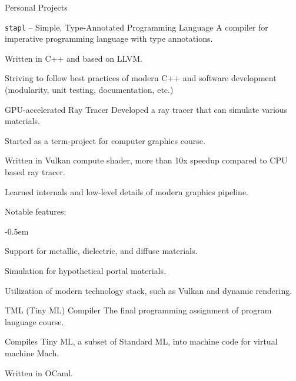 \documentclass{resume}
\begin{document}
\begin{res-section}{Personal Projects}
  \begin{res-subsection}{\texttt{stapl} -- Simple, Type-Annotated Programming Language}{}
    A compiler for imperative programming language with type annotations.

    \item Written in C++ and based on LLVM.

    \item Striving to follow best practices of modern C++ and software development (modularity, unit testing, documentation, etc.)
  \end{res-subsection}

  \begin{res-subsection}{GPU-accelerated Ray Tracer}{}
    Developed a ray tracer that can simulate various materials.

    \item Started as a term-project for computer graphics course.

    \item Written in Vulkan compute shader, more than 10x speedup compared to CPU based ray tracer.

    \item Learned internals and low-level details of modern graphics pipeline.

    \item Notable features:
    \vspace{-0.5em}
    \begin{list}{--}{}
      \itemsep -0.5em
      \item Support for metallic, dielectric, and diffuse materials.
      \item Simulation for hypothetical portal materials.
      \item Utilization of modern technology stack, such as Vulkan and dynamic rendering.
    \end{list}
  \end{res-subsection}

  \begin{res-subsection}{TML (Tiny ML) Compiler}{}
    The final programming assignment of program language course.

    \item Compiles Tiny ML, a subset of Standard ML, into machine code for virtual machine \textsf{Mach}.

    \item Written in OCaml.


\end{res-subsection}
\end{res-section}
\end{document}
